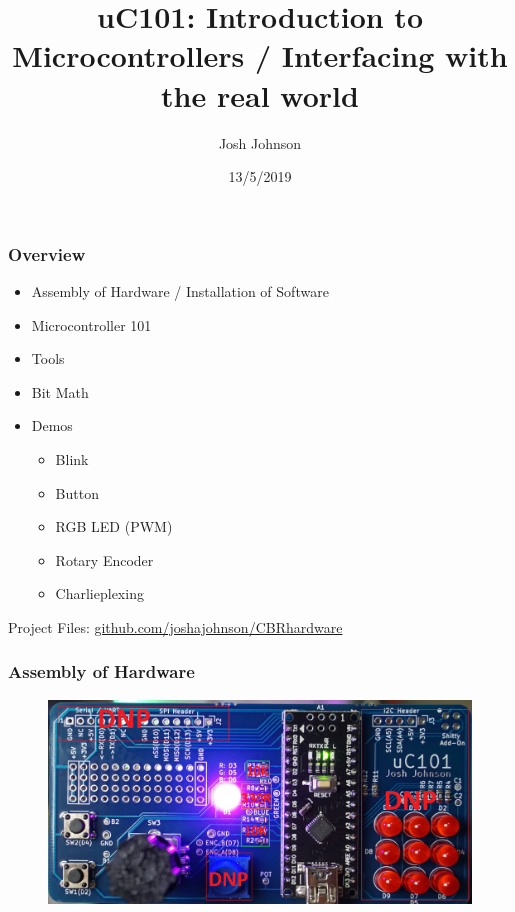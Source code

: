 \documentclass[t]{beamer}
\title[uC101]{uC101: Introduction to Microcontrollers / Interfacing with the real world} %
\author{Josh Johnson} %
\institute[] %
{ \\ %
\medskip
\textit{} %
}
\date{13/5/2019} %
\begin{document}
\begin{frame}
\titlepage %
\end{frame}


\begin{frame}
\frametitle{Overview}
\begin{itemize}
\item Assembly of Hardware / Installation of Software
\item Microcontroller 101
\item Tools
\item Bit Math
\item Demos
\begin{itemize}
	\item Blink
	\item Button
	\item RGB LED (PWM)
	\item Rotary Encoder
	\item Charlieplexing
\end{itemize}
	

\end{itemize}
\vspace{20mm}
Project Files: \url{github.com/joshajohnson/CBRhardware}\\
\end{frame}


\begin{frame}[t]
\frametitle{Assembly of Hardware}

\begin{figure}
	\includegraphics[width=1\linewidth]{hardware.JPG}
\end{figure}

\end{frame}
\end{document}

